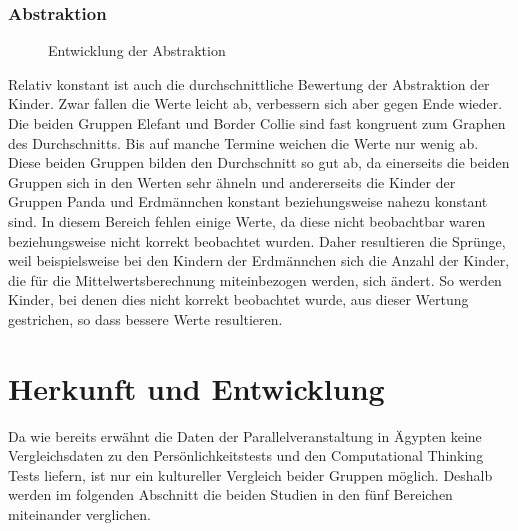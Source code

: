 \subsubsection{Abstraktion}
\begin{figure}[H]
	\centering
	\caption{Entwicklung der Abstraktion}
\end{figure}

Relativ konstant ist auch die durchschnittliche Bewertung der Abstraktion der Kinder. Zwar fallen die Werte leicht ab, verbessern sich aber gegen Ende wieder.\\
Die beiden Gruppen Elefant und Border Collie sind fast kongruent zum Graphen des Durchschnitts. Bis auf manche Termine weichen die Werte nur wenig ab. Diese beiden Gruppen bilden den Durchschnitt so gut ab, da einerseits die beiden Gruppen sich in den Werten sehr ähneln und andererseits die Kinder der Gruppen Panda und Erdmännchen konstant beziehungsweise nahezu konstant sind. In diesem Bereich fehlen einige Werte, da diese nicht beobachtbar waren beziehungsweise nicht korrekt beobachtet wurden. Daher resultieren die Sprünge, weil beispielsweise bei den Kindern der Erdmännchen sich die Anzahl der Kinder, die für die Mittelwertsberechnung miteinbezogen werden, sich ändert. So werden Kinder, bei denen dies nicht korrekt beobachtet wurde, aus dieser Wertung gestrichen, so dass bessere Werte resultieren.

\section{Herkunft und Entwicklung}
Da wie bereits erwähnt die Daten der Parallelveranstaltung in Ägypten keine Vergleichsdaten zu den Persönlichkeitstests und den Computational Thinking Tests liefern, ist nur ein kultureller Vergleich beider Gruppen möglich. Deshalb werden im folgenden Abschnitt die beiden Studien in den fünf Bereichen miteinander verglichen.


